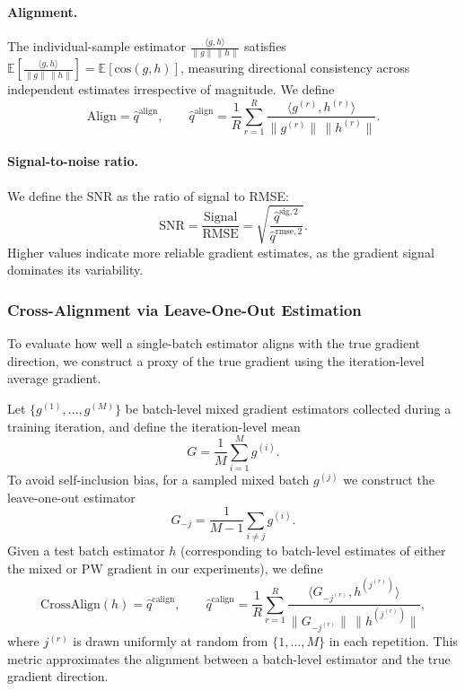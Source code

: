 \documentclass{article}
\theoremstyle{definition}
\theoremstyle{remark}
\begin{document}
\paragraph{Alignment.}
The individual-sample estimator $\frac{\langle g, h \rangle}{\|g\|\,\|h\|}$ satisfies
$\mathbb{E}\!\left[\frac{\langle g, h \rangle}{\|g\|\,\|h\|}\right] = \mathbb{E}\!\left[\mathrm{cos}(g, h)\right]$,
measuring directional consistency across independent estimates irrespective of magnitude. We define
\[
    \text{Align} = \hat{q}^{\mathrm{align}}, \qquad
    \hat{q}^{\mathrm{align}} = \frac{1}{R}\sum_{r=1}^R
    \frac{\langle g^{(r)}, h^{(r)} \rangle}{\|g^{(r)}\|\,\|h^{(r)}\|}.
\]

\paragraph{Signal-to-noise ratio.}
We define the SNR as the ratio of signal to RMSE:
\[
    \text{SNR} = \frac{\text{Signal}}{\text{RMSE}} =
    \sqrt{\frac{\hat{q}^{\mathrm{sig},2}}{\hat{q}^{\mathrm{rmse},2}}}.
\]
Higher values indicate more reliable gradient estimates, as the gradient signal dominates its
variability.

\subsubsection{Cross-Alignment via Leave-One-Out Estimation}

To evaluate how well a single-batch estimator aligns with the true gradient direction, we construct
a proxy of the true gradient using the iteration-level average gradient.

Let $\{g^{(1)}, \dots, g^{(M)}\}$ be batch-level mixed gradient estimators collected during a
training iteration, and define the iteration-level mean
\[
    G = \frac{1}{M} \sum_{i=1}^M g^{(i)}.
\]
To avoid self-inclusion bias, for a sampled mixed batch $g^{(j)}$ we construct the leave-one-out
estimator
\[
    G_{-j} = \frac{1}{M-1} \sum_{i \neq j} g^{(i)}.
\]
Given a test batch estimator $h$ (corresponding to batch-level estimates of either the mixed or
PW gradient in our experiments), we define
\[
    \text{CrossAlign}(h) = \hat{q}^{\mathrm{calign}}, \qquad
    \hat{q}^{\mathrm{calign}} = \frac{1}{R}\sum_{r=1}^{R}
    \frac{\langle G_{-j^{(r)}}, h^{(j^{(r)})} \rangle}{\|G_{-j^{(r)}}\|\,\|h^{(j^{(r)})}\|},
\]
where $j^{(r)}$ is drawn uniformly at random from $\{1, \dots, M\}$ in each repetition. This metric approximates the alignment between a
batch-level estimator and the true gradient direction.
\end{document}
